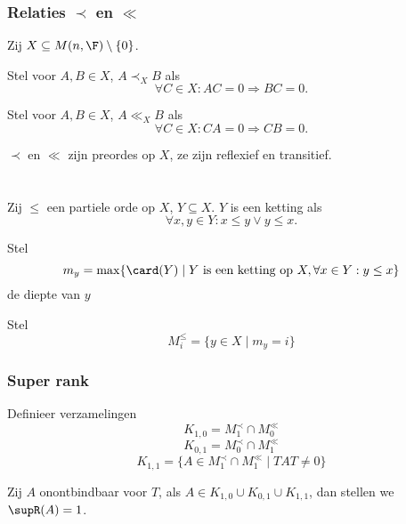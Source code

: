 \begin{frame}
\frametitle{Relaties $\prec$ en $\ll$}

\begin{block}{}
Zij $X \subseteq M(n,\F)\setminus \{0\} $. 

Stel voor $A,B \in X$, $A\prec_X B$ als 
$$\forall C \in X : AC = 0 \Rightarrow BC = 0.$$

Stel voor $A,B \in X$, $A \ll_X B $ als 
$$\forall C \in X : CA = 0 \Rightarrow CB = 0.$$

\end{block}

\begin{block}{}
$\prec$ en $\ll$ zijn preordes op $X$, ze zijn reflexief en transitief.
\end{block}


\end{frame}

\begin{frame}
\frametitle{ $ $ }

\begin{block}{}
Zij $\leq$ een partiele orde op $X$, $Y \subseteq X$. $Y$ is een ketting als 
$$ \forall x,y \in Y : x \leq y \vee y \leq x .$$
\end{block}

\begin{block}{}
Stel 
$$m_y = \max \{ \card (Y) \; | \; Y \text{ is een ketting op } X, \forall x \in Y: y \leq x \}$$ 
de diepte van $y$
\end{block}

\begin{block}{}
Stel 
$$M_{i}^{\leq} = \{ y \in X \; | \; m_y = i\}$$
\end{block}

\end{frame}



\begin{frame}
\frametitle{Super rank}

\begin{block}{}
Definieer verzamelingen
$$K_{1,0} = M_{1}^{\prec} \cap M_{0}^{\ll}$$
$$K_{0,1} = M_{0}^{\prec} \cap M_{1}^{\ll}$$
$$K_{1,1} = \{ A \in M_{1}^{\prec} \cap M_{1}^{\ll} \; | \; TAT \neq 0  \}$$
\end{block}

\begin{block}{}
Zij $A$ onontbindbaar voor $T$, als $A \in K_{1,0} \cup K_{0,1} \cup K_{1,1}$, dan stellen we $\supR (A) = 1$.
\end{block}


\end{frame}


